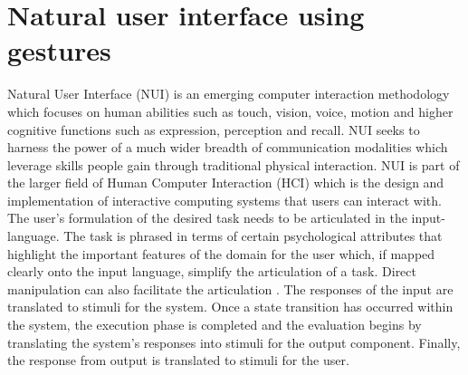\section{Natural user interface using gestures}
Natural User Interface (NUI) is an emerging computer interaction methodology which focuses on human abilities such as touch, vision, voice, motion and higher cognitive functions such as expression, perception and recall. 
NUI seeks to harness the power of a much wider breadth of communication modalities which leverage skills people gain through traditional physical interaction. NUI is part of the larger field of Human Computer Interaction (HCI) which is the design and implementation of interactive computing systems that users can interact with. 
The user's formulation of the desired task needs to be articulated in the input-language. The task is phrased in terms of certain psychological attributes that highlight the important features of the domain for the user which, if mapped clearly onto the input language, simplify the articulation of a task. Direct manipulation can also facilitate the articulation \cite{Dix2009}.
The responses of the input are translated to stimuli for the system. Once a state transition has occurred within the system, the execution phase is completed and the evaluation begins by translating the system's responses into stimuli for the output component. Finally, the response from output is translated to stimuli for the user. 

